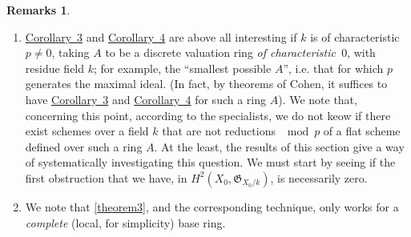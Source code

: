 \documentclass{article}
\theoremstyle{plain}
\theoremstyle{definition}
\newtheorem*{remarks}{Remarks}
\newcommand{\fk}{\mathfrak}
\newcommand{\oldpage}[1]{\marginpar{\footnotesize$\Big\vert$ \textit{p.~#1}}}
\begin{document}
\begin{remarks}
  \begin{enumerate}[1)]
    \item \hyperref[theorem9corollary3]{Corollary~3} and \hyperref[theorem9corollary4]{Corollary~4} are above all interesting if $k$ is of characteristic $p\neq0$, taking $A$ to be a discrete valuation ring \emph{of characteristic~$0$}, with residue field $k$;
      for example, the ``smallest possible $A$'', i.e. that for which $p$ generates the maximal ideal.
      (In fact, by theorems of Cohen, it suffices to have \hyperref[theorem9corollary3]{Corollary~3} and \hyperref[theorem9corollary4]{Corollary~4} for such a ring $A$).
      We note that, concerning this point, according to the specialists, we do not keow if there exist schemes over a field $k$ that are not reductions $\mod p$ of a flat scheme defined over such a ring $A$.
      At the least, the results of this section give a way of systematically investigating this question.
      We must start
\oldpage{182-15}
      by seeing if the first obstruction that we have, in $H^2(X_0,\fk{G}_{X_0/k})$, is necessarily zero.
    \item We note that \cref{theorem3}, and the corresponding technique, only works for a \emph{complete} (local, for simplicity) base ring.


\end{enumerate}
\end{remarks}
\end{document}
